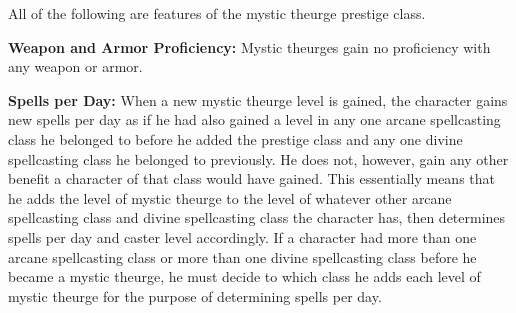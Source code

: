 All of the following are features of the mystic theurge prestige class.

\textbf{Weapon and Armor Proficiency:} Mystic theurges gain no proficiency with 
any weapon or armor.

\textbf{Spells per Day: }When a new mystic theurge level is gained, the character 
gains new spells per day as if he had also gained a level in any one arcane spellcasting 
class he belonged to before he added the prestige class and any one divine spellcasting 
class he belonged to previously. He does not, however, gain any other benefit a 
character of that class would have gained. This essentially means that he adds 
the level of mystic theurge to the level of whatever other arcane spellcasting 
class and divine spellcasting class the character has, then determines spells per 
day and caster level accordingly. If a character had more than one arcane spellcasting 
class or more than one divine spellcasting class before he became a mystic theurge, 
he must decide to which class he adds each level of mystic theurge for the purpose 
of determining spells per day.
